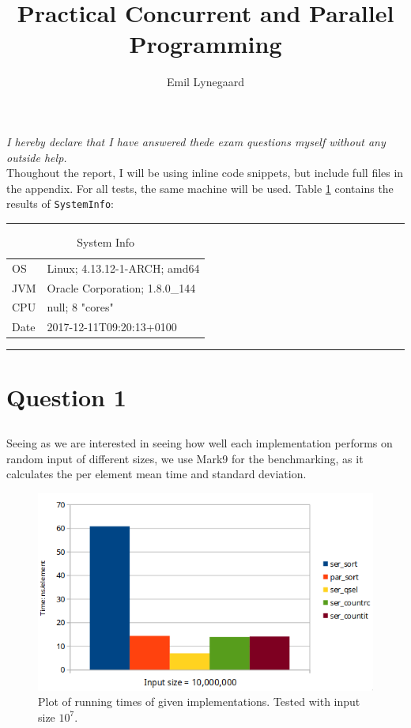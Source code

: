\documentclass[a5paper]{article}
\title{Practical Concurrent and Parallel Programming}
\author{Emil Lynegaard}
\begin{document}


\newpage
\tableofcontents
\newpage

\maketitle
\textit{I hereby declare that I have answered thede exam questions myself without any outside help.}\\

Thoughout the report, I will be using inline code snippets, but include full files in the appendix. For all tests, the same machine will be used. Table \ref{table:sysinfo} contains the results of \texttt{SystemInfo}:

\par\noindent\rule{\textwidth}{0.4pt}
\begin{table}[!ht]
\begin{center}
\begin{tabular}{ l l }
OS & Linux; 4.13.12-1-ARCH; amd64\\
JVM & Oracle Corporation; 1.8.0\_144\\
CPU & null; 8 "cores"\\
Date & 2017-12-11T09:20:13+0100
\end{tabular}
\end{center}
\caption{System Info}
\label{table:sysinfo}
\end{table}
\par\noindent\rule{\textwidth}{0.4pt}
\newpage

\section{Question 1}
\subsection{}
Seeing as we are interested in seeing how well each implementation performs on random input of different sizes, we use Mark9 for the benchmarking, as it calculates the per element mean time and standard deviation.

\begin{figure}[!ht]
    \centering
    \noindent\includegraphics[scale=0.5]{res/graph_q1.png}
    \caption{Plot of running times of given implementations. Tested with input size $10^7$.}
    \label{fig:graphq1}
\end{figure}
\end{document}
